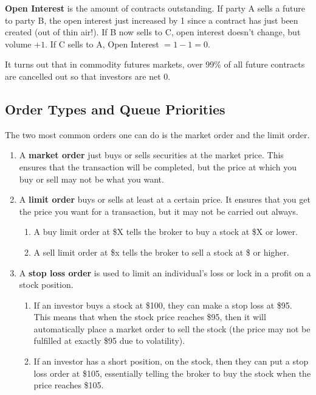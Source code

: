 \documentclass{article}
\begin{document}
    \begin{definition}
      \textbf{Open Interest} is the amount of contracts outstanding. If party A sells a future to party B, the open interest just increased by 1 since a contract has just been created (out of thin air!). If B now sells to C, open interest doesn't change, but volume $+1$. If C sells to A, Open Interest $= 1 - 1 = 0$.  
    \end{definition}

    It turns out that in commodity futures markets, over 99\% of all future contracts are cancelled out so that investors are net $0$. 

  \subsection{Order Types and Queue Priorities}

    \begin{definition}
      The two most common orders one can do is the market order and the limit order. 
      \begin{enumerate}
        \item A \textbf{market order} just buys or sells securities at the market price. This ensures that the transaction will be completed, but the price at which you buy or sell may not be what you want. 
        \item A \textbf{limit order} buys or sells at least at a certain price. It ensures that you get the price you want for a transaction, but it may not be carried out always. 
        \begin{enumerate}
          \item A buy limit order at \$X tells the broker to buy a stock at \$X or lower. 
          \item A sell limit order at \$x tells the broker to sell a stock at \$ or higher. 
        \end{enumerate}
        \item A \textbf{stop loss order} is used to limit an individual's loss or lock in a profit on a stock position. 
        \begin{enumerate}
          \item If an investor buys a stock at \$100, they can make a stop loss at \$95. This means that when the stock price reaches \$95, then it will automatically place a market order to sell the stock (the price may not be fulfilled at exactly \$95 due to volatility). 
          \item If an investor has a short position, on the stock, then they can put a stop loss order at \$105, essentially telling the broker to buy the stock when the price reaches \$105. 
        \end{enumerate}
      \end{enumerate}
    \end{definition}
\end{document}
